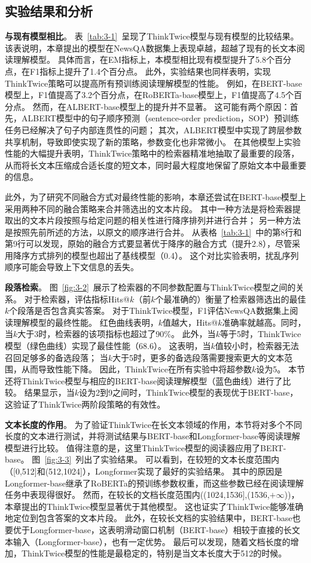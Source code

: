 \subsection{实验结果和分析}
\textbf{与现有模型相比}。
表~\ref{tab:3-1}~呈现了ThinkTwice模型与现有模型的比较结果。
该表说明，本章提出的模型在NewsQA数据集上表现卓越，超越了现有的长文本阅读理解模型。
具体而言，在EM指标上，本模型相比现有模型提升了5.8个百分点，在F1指标上提升了1.4个百分点。
此外，实验结果也同样表明，实现ThinkTwice策略可以提高所有预训练阅读理解模型的性能。
例如，在BERT-base模型上，F1值提高了3.2个百分点，在RoBERTa-base模型上，F1值提高了4.5个百分点。
然而，在ALBERT-base模型上的提升并不显著。
这可能有两个原因：首先，ALBERT模型中的句子顺序预测（sentence-order prediction，SOP）预训练任务已经解决了句子内部连贯性的问题；
其次，ALBERT模型中实现了跨层参数共享机制，导致即使实现了新的策略，参数变化也非常微小。
在其他模型上实验性能的大幅提升表明，ThinkTwice策略中的检索器精准地抽取了最重要的段落，从而将长文本压缩成合适长度的短文本，同时最大程度地保留了原始文本中最重要的信息。

此外，为了研究不同融合方式对最终性能的影响，本章还尝试在BERT-base模型上采用两种不同的融合策略来合并筛选出的文本片段。
其中一种方法是将检索器提取出的文本片段按照与给定问题的相关性进行降序排列并进行合并；
另一种方法是按照先前所述的方法，以原文的顺序进行合并。
从表格~\ref{tab:3-1}~中的第8行和第9行可以发现，原始的融合方式要显著优于降序的融合方式（提升2.8），尽管采用降序方式排列的模型也超出了基线模型（0.4）。
这个对比实验表明，扰乱序列顺序可能会导致上下文信息的丢失。

\textbf{段落检索}。
图~\ref{fig:3-2}~展示了检索器的不同参数配置与ThinkTwice模型之间的关系。
对于检索器，评估指标Hits@$k$（前$k$个最准确的）衡量了检索器筛选出的最佳$k$个段落是否包含真实答案。
对于ThinkTwice模型，F1评估NewsQA数据集上阅读理解模型的最终性能。
红色曲线表明，$k$值越大，Hits@$k$准确率就越高。同时，当$k$大于3时，检索器的该项指标也超过了90\%。
此外，当$k$等于5时，ThinkTwice模型（绿色曲线）实现了最佳性能（68.6）。
这表明，当$k$值较小时，检索器无法召回足够多的备选段落；
当$k$大于5时，更多的备选段落需要搜索更大的文本范围，从而导致性能下降。
因此，ThinkTwice在所有实验中将超参数$k$设为5。
本节还将ThinkTwice模型与相应的BERT-base阅读理解模型（蓝色曲线）进行了比较。
结果显示，当$k$设为2到9之间时，ThinkTwice模型的表现优于BERT-base，这验证了ThinkTwice两阶段策略的有效性。



\textbf{文本长度的作用}。
为了验证ThinkTwice在长文本领域的作用，本节将对多个不同长度的文本进行测试，并将测试结果与BERT-base和Longformer-base等阅读理解模型进行比较。
值得注意的是，这里ThinkTwice模型的阅读器应用了BERT-base。
图~\ref{fig:3-3}~列出了实验结果。
可以看到，在较短的文本长度范围内（[0,512]和(512,1024]），Longformer实现了最好的实验结果。
其中的原因是Longformer-base继承了RoBERTa的预训练参数权重，而这些参数已经在阅读理解任务中表现得很好。
然而，在较长的文档长度范围内((1024,1536],(1536,$+\infty$))，本章提出的ThinkTwice模型显著优于其他模型。
这也证实了ThinkTwice能够准确地定位到包含答案的文本片段。
此外，在较长文档的实验结果中，BERT-base也要优于Longformer-base，这表明滑动窗口机制（BERT-base）相较于直接的长文本输入（Longformer-base），也有一定优势。
最后可以发现，随着文档长度的增加，ThinkTwice模型的性能是最稳定的，特别是当文本长度大于512的时候。

